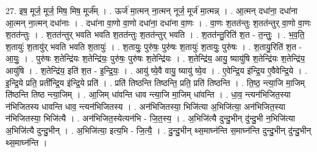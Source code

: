 \documentclass[17pt]{extarticle}
\begin{document}
27. इष॒ मूर्ज॒ मूर्ज॒ मिष॒ मिष॒ मूर्ज᳚म् । . ऊर्ज॑ मा॒त्मन् ना॒त्मन् नूर्ज॒ मूर्ज॑ मा॒त्मन्न् । . आ॒त्मन् दधा॑ना॒ दधा॑ना आ॒त्मन् ना॒त्मन् दधा॑नाः । . दधा॑ना वा॒णो वा॒णो दधा॑ना॒ दधा॑ना वा॒णः । . वा॒णः श॒तत॑न्तुः श॒तत॑न्तुर् वा॒णो वा॒णः श॒तत॑न्तुः । . श॒तत॑न्तुर् भवति भवति श॒तत॑न्तुः श॒तत॑न्तुर् भवति । . श॒तत॑न्तु॒रिति॑ श॒त - त॒न्तुः॒ । . भ॒व॒ति॒ श॒तायुः॑ श॒तायु॑र् भवति भवति श॒तायुः॑ । . श॒तायुः॒ पुरु॑षः॒ पुरु॑षः श॒तायुः॑ श॒तायुः॒ पुरु॑षः । . श॒तायु॒रिति॑ श॒त - आ॒युः॒ । . पुरु॑षः श॒तेन्द्रि॑यः श॒तेन्द्रि॑यः॒ पुरु॑षः॒ पुरु॑षः श॒तेन्द्रि॑यः । . श॒तेन्द्रि॑य॒ आयु॒ ष्यायु॑षि श॒तेन्द्रि॑यः श॒तेन्द्रि॑य॒ आयु॑षि । . श॒तेन्द्रि॑य॒ इति॑ श॒त - इ॒न्द्रि॒यः॒ । . आयु॑ ष्ये॒वै वायु॒ ष्यायु॑ ष्ये॒व । . ए॒वेन्द्रि॒य इ॑न्द्रि॒य ए॒वैवेन्द्रि॒ये । . इ॒न्द्रि॒ये प्रति॒ प्रती᳚न्द्रि॒य इ॑न्द्रि॒ये प्रति॑ । . प्रति॑ तिष्ठन्ति तिष्ठन्ति॒ प्रति॒ प्रति॑ तिष्ठन्ति । . ति॒ष्ठ॒ न्त्या॒जि मा॒जिम् ति॑ष्ठन्ति तिष्ठ न्त्या॒जिम् । . आ॒जिम् धा॑वन्ति धाव न्त्या॒जि मा॒जिम् धा॑वन्ति । . धा॒व॒ न्त्यन॑भिजित॒स्या न॑भिजितस्य धावन्ति धाव॒ न्त्यन॑भिजितस्य । . अन॑भिजितस्या॒ भिजि॑त्या अ॒भिजि॑त्या॒ अन॑भिजित॒स्या न॑भिजितस्या॒ भिजि॑त्यै । . अन॑भिजित॒स्येत्यन॑भि - जि॒त॒स्य॒ । . अ॒भिजि॑त्यै दुन्दु॒भीन् दु॑न्दु॒भी न॒भिजि॑त्या अ॒भिजि॑त्यै दुन्दु॒भीन् । . अ॒भिजि॑त्या॒ इत्य॒भि - जि॒त्यै॒ । . दु॒न्दु॒भीन् थ्स॒माघ्न॑न्ति स॒माघ्न॑न्ति दुन्दु॒भीन् दु॑न्दु॒भीन् थ्स॒माघ्न॑न्ति । \newline
\end{document}
